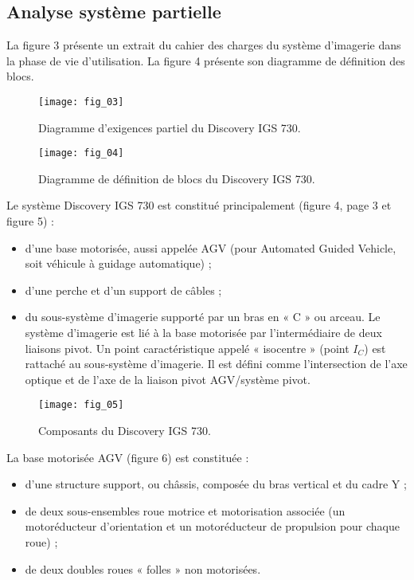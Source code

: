 \subsection{Analyse système partielle}
La figure 3 présente un extrait du cahier des charges du système d’imagerie dans la phase de vie
d’utilisation. La figure 4 présente son diagramme de définition des blocs.


\begin{figure}[!h]
\centering
\texttt{[image: fig\_03]}
\caption{\label{fig:03}  Diagramme d’exigences partiel du Discovery IGS 730.}
\end{figure}


\begin{figure}[!h]
\centering
\texttt{[image: fig\_04]}
\caption{\label{fig:04}  Diagramme de définition de blocs du Discovery IGS 730.}
\end{figure}

Le système Discovery IGS 730 est constitué principalement (figure 4, page 3 et figure 5) :
\begin{itemize}
\item d’une base motorisée, aussi appelée AGV (pour Automated Guided Vehicle, soit véhicule à
guidage automatique) ;
\item d’une perche et d’un support de câbles ;
\item du sous-système d’imagerie supporté par un bras en « C » ou arceau. Le système d’imagerie
est lié à la base motorisée par l’intermédiaire de deux liaisons pivot. Un point caractéristique
appelé « isocentre » (point $I_C$) est rattaché au sous-système d’imagerie. Il est défini comme
l’intersection de l’axe optique et de l’axe de la liaison pivot AGV/système pivot.
\end{itemize}

\begin{figure}[!h]
\centering
\texttt{[image: fig\_05]}
\caption{\label{fig:05}  Composants du Discovery IGS 730.}
\end{figure}

La base motorisée AGV (figure 6) est constituée :
\begin{itemize}
\item d’une structure support, ou châssis, composée du bras vertical et du cadre Y ;
\item de deux sous-ensembles roue motrice et motorisation associée (un motoréducteur d’orientation et un motoréducteur de propulsion pour chaque roue) ;
\item de deux doubles roues « folles » non motorisées.
\end{itemize}


